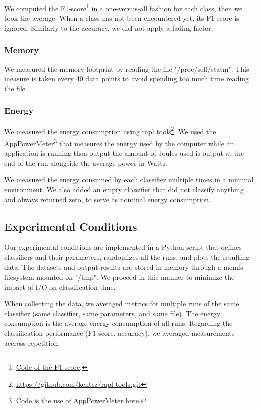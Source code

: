 We computed the
F1-score\footnote{\href{https://github.com/azazel7/paper-benchmark/blob/9adb1039c5a65a00a66d554f0e870d14d3fff7cb/main.cpp\#L82}{Code
of the F1-score}.} in a one-versus-all fashion for each class, then we took the
average.  When a class has not been encountered yet, its F1-score is ignored.
Similarly to the accuracy, we did not apply a fading factor.

\subsubsection{Memory}
We measured the memory footprint by reading the file "/proc/self/statm". This measure is
taken every 40 data points to avoid spending too much time reading the file.

\subsubsection{Energy}
We measured the energy consumption using rapl
tools\footnote{\url{https://github.com/kentcz/rapl-tools.git}}.  We used the
AppPowerMeter\footnote{\href{https://github.com/azazel7/paper-benchmark/blob/9adb1039c5a65a00a66d554f0e870d14d3fff7cb/makefile.py\#L122}{Code
is the use of AppPowerMeter here}.} that measures the energy used by the
computer while an application is running then output the amount of Joules used
is output at the end of the run alongside the average power in Watts.

We measured the energy consumed by each classifier
multiple times in a minimal environment. We also added an empty
classifier that did not classify anything and always
returned zero, to serve as nominal energy consumption.

\subsection{Experimental Conditions}
Our experimental conditions are implemented in a Python script that defines
classifiers and their parameters, randomizes all the runs, and plots the
resulting data. The datasets and output results are stored in memory
through a memfs filesystem mounted on "/tmp". We proceed in this manner to
minimize the impact of I/O on classification time.

When collecting the data, we averaged metrics for multiple runs of the same
classifier (same classifier, same parameters, and same file). The energy
consumption is the average energy consumption of all runs. Regarding the
classification performance (F1-score, accuracy), we averaged measurements
accross repetition.

